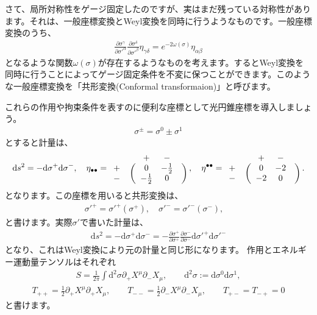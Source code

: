 \documentclass[report,paper=a4, fontsize=12pt, line_length=16cm, number_of_lines=33,dvipdfmx]{jlreq}
\numberwithin{equation}{chapter}
\numberwithin{equation}{section}
\newcommand{\del}{\partial}
\newcommand{\di}{\mathrm{d}}
\begin{document}
さて、局所対称性をゲージ固定したのですが、実はまだ残っている対称性があります。それは、一般座標変換とWeyl変換を同時に行うようなものです。一般座標変換のうち、
\begin{align}
\frac{\del \sigma^{\gamma}}{\del \sigma'^{\alpha}}
\frac{\del \sigma^{\delta}}{\del \sigma'^{\beta}}
\eta_{\gamma\delta}
=e^{-2\omega(\sigma)}\eta_{\alpha\beta}
\end{align}
となるような関数$\omega(\sigma)$が存在するようなものを考えます。するとWeyl変換を同時に行うことによってゲージ固定条件を不変に保つことができます。このような一般座標変換を「共形変換(Conformal transformaion)」と呼びます。

これらの作用や拘束条件を表すのに便利な座標として光円錐座標を導入しましょう。
\begin{align}
\sigma^{\pm}=\sigma^{0}\pm\sigma^{1}
\end{align}
とすると計量は、
\begin{align}
\di s^2=-\di \sigma^{+}\di \sigma^{-},\quad
\eta_{\bullet\bullet}=
\begin{array}{crccl}
      && + & - & \\
 + &\ldelim({2}{4pt}[] &0     & -\frac12 &\rdelim){2}{4pt}[]          \\
 - &  &-\frac12      & 0  &
\end{array}
,\quad
\eta^{\bullet\bullet}=
\begin{array}{crccl}
      && + & - & \\
 + &\ldelim({2}{4pt}[] &0     & -2 &\rdelim){2}{4pt}[]          \\
 - &  &-2      & 0  &
\end{array}.
\end{align}
となります。この座標を用いると共形変換は、
\begin{align}
\sigma'^{+}=\sigma'^{+}(\sigma^{+}),\quad
\sigma'^{-}=\sigma'^{-}(\sigma^{-}),\quad
\end{align}
と書けます。実際$\sigma'$で書いた計量は、
\begin{align}
\di s^2=-\di \sigma^{+}\di \sigma^{-}
=-
\frac{\del \sigma^{+}}{\del \sigma^{+}}
\frac{\del \sigma^{-}}{\del \sigma^{-}}
\di \sigma'^{+}\di \sigma'^{-}
\end{align}
となり、これはWeyl変換により元の計量と同じ形になります。
作用とエネルギー運動量テンソルはそれぞれ
\begin{align}
S=\frac{1}{2\pi}\int \di^2\sigma \del_{+}X^{\mu}\del_{-}X_{\mu},\qquad \di^2\sigma:=\di\sigma^0 \di\sigma^1,
\label{fixed-action}
\end{align}
\begin{align}
T_{++}=\frac12 \del_{+}X^{\mu}\del_{+}X_{\mu},\qquad
T_{--}=\frac12 \del_{-}X^{\mu}\del_{-}X_{\mu},\qquad
T_{+-}=T_{-+}=0
\label{fixed-em}
\end{align}
と書けます。
\end{document}
